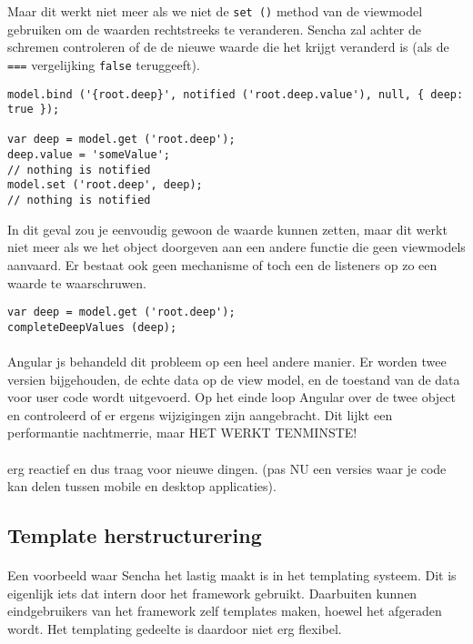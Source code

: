 Maar dit werkt niet meer als we niet de \lstinline{set ()} method van de viewmodel
gebruiken om de waarden rechtstreeks te veranderen. Sencha zal achter de schremen
controleren of de de nieuwe waarde die het krijgt veranderd is (als de \lstinline{===}
vergelijking \lstinline{false} teruggeeft).

\begin{lstlisting}[language=ownjavascript]
model.bind ('{root.deep}', notified ('root.deep.value'), null, { deep: true });

var deep = model.get ('root.deep');
deep.value = 'someValue';
// nothing is notified
model.set ('root.deep', deep);
// nothing is notified
\end{lstlisting}

In dit geval zou je eenvoudig gewoon de waarde kunnen zetten, maar dit werkt niet meer als
we het object doorgeven aan een andere functie die geen viewmodels aanvaard. Er bestaat
ook geen mechanisme of toch een de listeners op zo een waarde te waarschruwen.

\begin{lstlisting}[language=ownjavascript]
var deep = model.get ('root.deep');
completeDeepValues (deep);
\end{lstlisting}

\paragraph {} Angular js behandeld dit probleem op een heel andere manier. Er worden twee
versien bijgehouden, de echte data op de view model, en de toestand van de data voor user
code wordt uitgevoerd. Op het einde loop Angular over de twee object en controleerd of er
ergens wijzigingen zijn aangebracht. Dit lijkt een performantie nachtmerrie, maar HET
WERKT TENMINSTE!


\paragraph {} erg reactief en dus traag voor nieuwe dingen. (pas NU een versies waar je
code kan delen tussen mobile en desktop applicaties).


\subsection {Template herstructurering}

\paragraph {} Een voorbeeld waar Sencha het lastig maakt is in het templating systeem. Dit
is eigenlijk iets dat intern door het framework gebruikt. Daarbuiten kunnen eindgebruikers
van het framework zelf templates maken, hoewel het afgeraden wordt. Het templating
gedeelte is daardoor niet erg flexibel.

